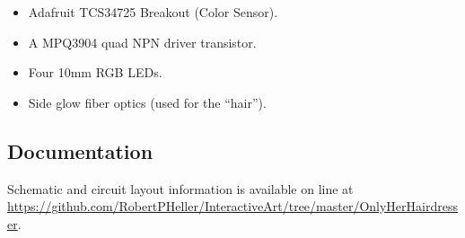 \begin{itemize}
\item Adafruit TCS34725  Breakout (Color Sensor).
\item A MPQ3904 quad NPN driver transistor.
\item Four 10mm RGB LEDs.
\item Side glow fiber optics (used for the ``hair'').
\end{itemize}

\subsection*{Documentation}

Schematic and circuit layout information is available on line at 
\url{https://github.com/RobertPHeller/InteractiveArt/tree/master/OnlyHerHairdresser}.
